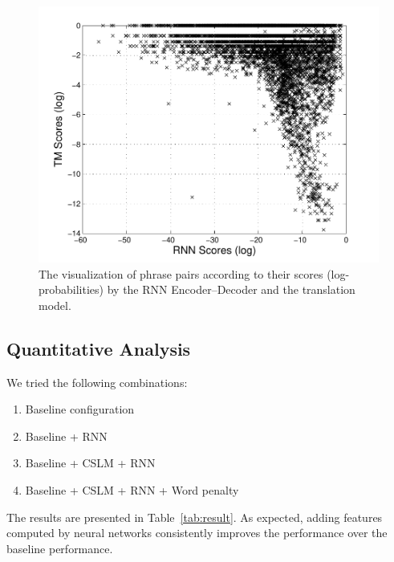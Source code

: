 \begin{figure}[h]
    \centering
    \includegraphics[width=0.9\columnwidth]{figures/scores.pdf}
    \caption{
        The visualization of phrase pairs according to their scores
        (log-probabilities) by the RNN Encoder--Decoder and the translation
        model. 
    }
    \label{fig:scores}
    \vspace{-3mm}
\end{figure}

\subsection{Quantitative Analysis}


We tried the following combinations:
\begin{enumerate}
    \itemsep -0.7em
    \item Baseline configuration
    \item Baseline + RNN
    \item Baseline + CSLM + RNN
    \item Baseline + CSLM + RNN + Word penalty
\end{enumerate}

The results are presented in Table~\mbox{\ref{tab:result}}. As expected, adding
features computed by neural networks consistently improves the performance over
the baseline performance. 

